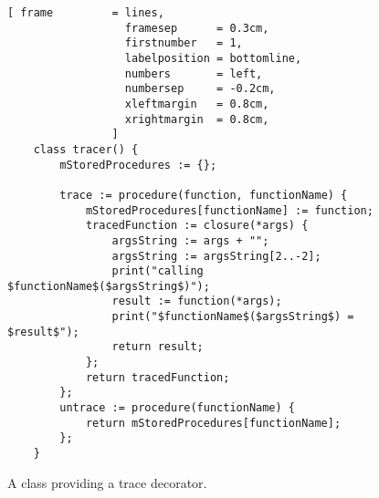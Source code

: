 \begin{figure}[!ht]
\centering
\begin{Verbatim}[ frame         = lines, 
                  framesep      = 0.3cm, 
                  firstnumber   = 1,
                  labelposition = bottomline,
                  numbers       = left,
                  numbersep     = -0.2cm,
                  xleftmargin   = 0.8cm,
                  xrightmargin  = 0.8cm,
                ]
    class tracer() {
        mStoredProcedures := {};
        
        trace := procedure(function, functionName) {
            mStoredProcedures[functionName] := function;
            tracedFunction := closure(*args) {
                argsString := args + "";
                argsString := argsString[2..-2];
                print("calling $functionName$($argsString$)");
                result := function(*args);
                print("$functionName$($argsString$) = $result$");
                return result;
            };
            return tracedFunction;
        };
        untrace := procedure(functionName) {
            return mStoredProcedures[functionName];
        };
    }
\end{Verbatim}
\vspace*{-0.3cm}
\caption{A class providing a trace decorator.}
\label{fig:tarce-decorator.stlx}
\end{figure}

